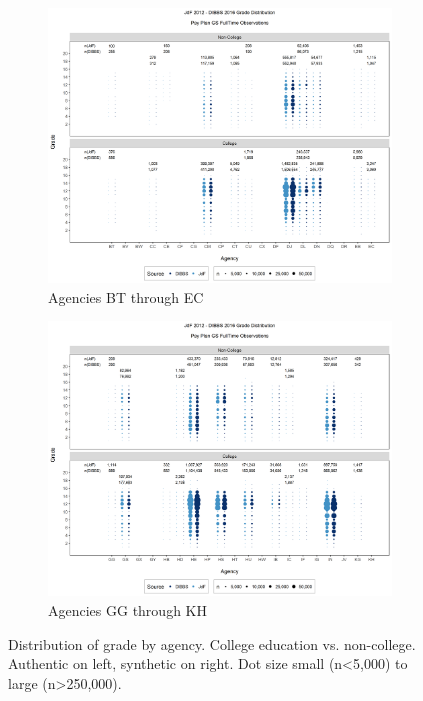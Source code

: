 \documentclass[10pt, letterpaper]{article}
\begin{document}
\begin{spacing}{1.0}
\clearpage

\begin{figure}[]
    \centering
    \begin{subfigure}{1\textwidth}
        \centering
        \includegraphics[width=6in, trim={0 0.55in 0 0.75in}, clip]{JdFDIBBSGSFullTimeGradeCollegeAgency21.png}
        \caption{Agencies BT through EC}
        \vspace{10pt}
    \end{subfigure}
    \begin{subfigure}{1\textwidth}
        \centering
        \includegraphics[width=6in, trim={0 0.55in 0 0.75in}, clip]{JdFDIBBSGSFullTimeGradeCollegeAgency61.png}
        \caption{Agencies GG through KH}
    \end{subfigure}
    \caption{Distribution of grade by agency.  College education vs. non-college.  Authentic on left, synthetic on right.  Dot size small (n<5,000) to large (n>250,000).}
    \label{figure:JdFDIBBSGSFullTimeGradeCollegeAgency}
\end{figure}


\end{spacing}
\end{document}

